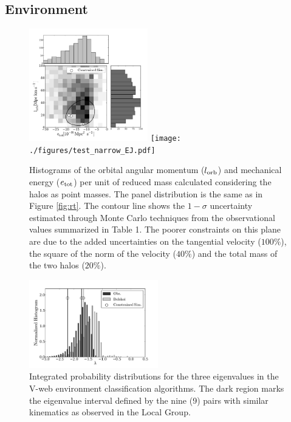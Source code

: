 \documentclass{emulateapj}
\begin{document}
\subsection{Environment}


\begin{figure}
\begin{center}
\includegraphics[keepaspectratio=true,width=0.46\textwidth]{./figures/test_EJ.pdf}
\texttt{[image: ./figures/test\_narrow\_EJ.pdf]}
\caption{Histograms of the orbital angular momentum ($l_{\rm orb}$) and mechanical energy ($e_{\rm tot}$) per unit of reduced mass calculated considering the halos as point masses. The panel distribution is the same as in Figure \ref{fig:rt}. The contour line shows the $1-\sigma$ uncertainty estimated through Monte Carlo techniques from the observational values summarized in Table 1. The poorer constraints on this plane are due to the added uncertainties on the tangential velocity ($100\%$), the square of the norm of the velocity ($40\%$) and the total mass of the two halos ($20\%$). }
\label{fig:EJ}
\end{center}
\end{figure}

\begin{figure}
\begin{center}
\includegraphics[keepaspectratio=true,width=0.50\textwidth]{./figures/test_lambda.pdf}
\caption{Integrated probability distributions for the three eigenvalues in the V-web environment classification algorithms. The dark region marks the eigenvalue interval defined by the nine (9) pairs with similar kinematics as observed in the Local Group.}
\label{fig:lambda}
\end{center}
\end{figure}
\end{document}
